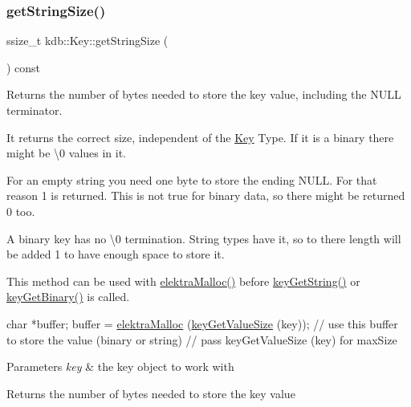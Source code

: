 \subsubsection{\texorpdfstring{get\+String\+Size()}{getStringSize()}}
{\footnotesize\ttfamily ssize\+\_\+t kdb\+::\+Key\+::get\+String\+Size (\begin{DoxyParamCaption}{ }\end{DoxyParamCaption}) const\hspace{0.3cm}{\ttfamily [inline]}}



Returns the number of bytes needed to store the key value, including the N\+U\+LL terminator. 

It returns the correct size, independent of the \hyperlink{classkdb_1_1Key}{Key} Type. If it is a binary there might be \textquotesingle{}\textbackslash{}0\textquotesingle{} values in it.

For an empty string you need one byte to store the ending N\+U\+LL. For that reason 1 is returned. This is not true for binary data, so there might be returned 0 too.

A binary key has no \textquotesingle{}\textbackslash{}0\textquotesingle{} termination. String types have it, so to there length will be added 1 to have enough space to store it.

This method can be used with \hyperlink{internal_8c_a35cdc2e5caed3454cb73b4fc7f37858c}{elektra\+Malloc()} before \hyperlink{group__keyvalue_ga41b9fac5ccddafe407fc0ae1e2eb8778}{key\+Get\+String()} or \hyperlink{group__keyvalue_ga4c0d8a4a11174197699c231e0b5c3c84}{key\+Get\+Binary()} is called.


\begin{DoxyCode}
\textcolor{keywordtype}{char} *buffer;
buffer = \hyperlink{internal_8c_a35cdc2e5caed3454cb73b4fc7f37858c}{elektraMalloc} (\hyperlink{group__keyvalue_gae326672fffb7474abfe9baf53b73217e}{keyGetValueSize} (key));
\textcolor{comment}{// use this buffer to store the value (binary or string)}
\textcolor{comment}{// pass keyGetValueSize (key) for maxSize}
\end{DoxyCode}



\begin{DoxyParams}{Parameters}
{\em key} & the key object to work with \\
\hline
\end{DoxyParams}
\begin{DoxyReturn}{Returns}
the number of bytes needed to store the key value 
\end{DoxyReturn}

